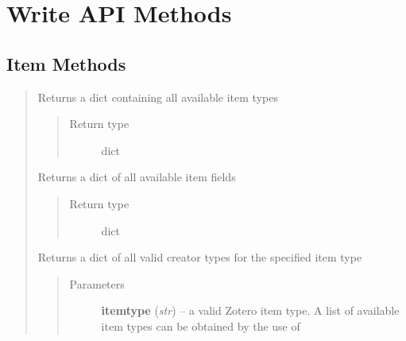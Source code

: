 \documentclass[letterpaper,10pt,english]{sphinxmanual}
\begin{document}
\chapter{Write API Methods}
\label{index:write-api-methods}

\section{Item Methods}
\label{index:item-methods}\begin{quote}

\begin{fulllineitems}
\label{index:pyzotero.zotero.Zotero.item_types}
Returns a dict containing all available item types
\begin{quote}\begin{description}
\item[{Return type}] \leavevmode
dict

\end{description}\end{quote}

\end{fulllineitems}


\begin{fulllineitems}
\label{index:pyzotero.zotero.Zotero.item_fields}
Returns a dict of all available item fields
\begin{quote}\begin{description}
\item[{Return type}] \leavevmode
dict

\end{description}\end{quote}

\end{fulllineitems}


\begin{fulllineitems}
\label{index:pyzotero.zotero.Zotero.item_creator_types}
Returns a dict of all valid creator types for the specified item type
\begin{quote}\begin{description}
\item[{Parameters}] \leavevmode
\textbf{itemtype} (\emph{str}) -- a valid Zotero item type. A list of available item types can be obtained by the use of {\hyperref[index:pyzotero.zotero.Zotero.item_types]{}}


\end{description}
\end{quote}
\end{fulllineitems}
\end{quote}
\end{document}
